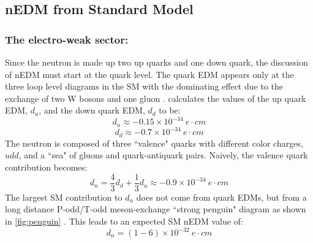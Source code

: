 \subsection{nEDM from Standard Model}

\subsubsection{The electro-weak sector:}

Since the neutron is made up two up quarks and one down quark, the discussion of nEDM must start at the quark level. The quark EDM appears only at the three loop level diagrams in the SM with the dominating effect due to the exchange of two W bosons and one gluon \cite{Czarnecki1997, Chupp2019}. \cite{Czarnecki1997} calculates the values of the up quark EDM, $d_{u}$, and the down quark EDM, $d_{d}$ to be:
\begin{equation}
    d_{u} \approx -0.15\times10^{-34} \ e \cdot cm 
\end{equation}
\begin{equation}
    d_{d} \approx -0.7\times10^{-34} \ e \cdot cm
\end{equation}
The neutron is composed of three ``valence" quarks with different color charges, $udd$, and a ``sea" of gluons and quark-antiquark pairs. Naively, the valence quark contribution becomes:
\begin{equation}
    d_{n} = \frac{4}{3}d_{d} + \frac{1}{3}d_{u} \approx -0.9\times10^{-34} \ e \cdot cm
\end{equation}
The largest SM contribution to $d_n$ does not come from quark EDMs, but from a long distance P-odd/T-odd meson-exchange ``strong penguin" diagram as shown in \cref{fig:penguin} \cite{Seng2015, Chupp2019}. This leads to an expected SM nEDM value of:
\begin{equation}
    d_{n} = (1-6) \times 10^{-32} ~ e \cdot cm
\end{equation}

